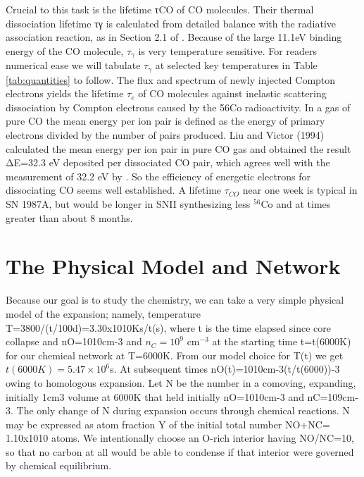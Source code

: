 \documentclass[manuscript]{aastex}
\begin{document}
Crucial to this task is the lifetime τCO of CO molecules. Their thermal
dissociation lifetime τγ is calculated from detailed balance with the
radiative association reaction, as in Section 2.1 of
\citet{2001ApJ...562..480C}.
Because of the large 11.1eV binding energy of the CO molecule,
$\tau_\gamma$ is very
temperature sensitive.  For readers numerical ease we will tabulate
$\tau_\gamma$ at
selected key temperatures in Table \ref{tab:quantities} to follow.
The flux and spectrum of newly
injected Compton electrons \citep{1991ApJ...375..221C} yields the lifetime
$\tau_e$ of CO
molecules against inelastic scattering dissociation by Compton electrons
caused by the 56Co radioactivity. In a gas of pure CO the mean energy per ion
pair is defined as the energy of primary electrons divided by the number of
pairs produced. Liu and Victor (1994) calculated the mean energy per ion pair
in pure CO gas and obtained the result ΔE=32.3 eV deposited per dissociated CO
pair, which agrees well with the measurement of 32.2 eV by
\citet{1968...Klots}.
So the efficiency of energetic electrons for dissociating CO seems well
established. A lifetime $\tau_{CO}$ near one week is typical in SN 1987A, but
would be longer in SNII synthesizing less $^{56}$Co and at times greater than
about 8 months.

\section{The Physical Model and Network}

Because our goal is to study the chemistry, we can take a very simple physical
model of the expansion; namely, temperature T=3800/(t/100d)=3.30x1010Ks/t(s),
where t is the time elapsed since core collapse and nO=1010cm-3 and
$n_C = 10^9$ cm$^{-3}$
at the starting time t=t(6000K) for our chemical network at
T=6000K. From our model choice for T(t) we get
$t(6000K) = 5.47 \times 10^6$s. At
subsequent times nO(t)=1010cm-3(t/t(6000))-3 owing to homologous expansion.
Let N be the number in a comoving, expanding, initially 1cm3 volume at 6000K
that held initially nO=1010cm-3 and nC=109cm-3. The only change of N during
expansion occurs through chemical reactions. N may be expressed as atom
fraction Y of the initial total number NO+NC= 1.10x1010 atoms. We
intentionally choose an O-rich interior having NO/NC=10, so that no carbon at
all would be able to condense if that interior were governed by chemical
equilibrium. 
\end{document}
